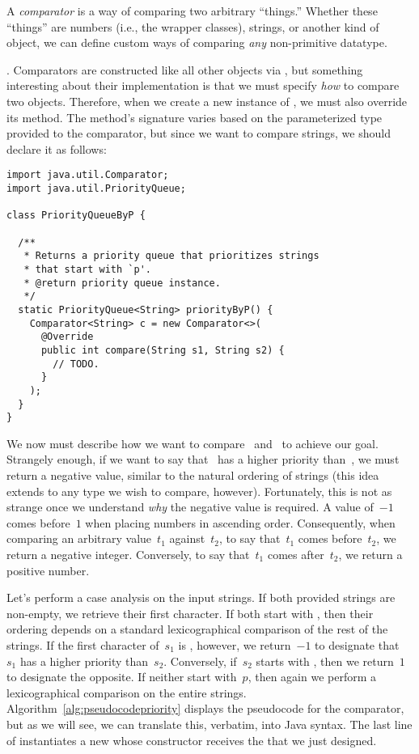 A \emph{comparator} is a way of comparing two arbitrary ``things.'' 
Whether these ``things'' are numbers (i.e., the wrapper classes), strings, or another kind of object, we can define custom ways of comparing \emph{any} non-primitive datatype.

.
Comparators are constructed like all other objects via , but something interesting about their implementation is that we must specify \emph{how} to compare two objects. 
Therefore, when we create a new instance of , we must also override its  method. 
The  method's signature varies based on the parameterized type provided to the comparator, but since we want to compare strings, we should declare it as follows:

\begin{lstlisting}[language=MyJava]
import java.util.Comparator;
import java.util.PriorityQueue;

class PriorityQueueByP {

  /**
   * Returns a priority queue that prioritizes strings 
   * that start with `p'.
   * @return priority queue instance.
   */
  static PriorityQueue<String> priorityByP() {
    Comparator<String> c = new Comparator<>(
      @Override
      public int compare(String s1, String s2) { 
        // TODO.
      }
    );
  }
}
\end{lstlisting}

We now must describe how we want to compare~ and~ to achieve our goal.
Strangely enough, if we want to say that~ has a higher priority than~, we must return a negative value, similar to the natural ordering of strings (this idea extends to any type we wish to compare, however). 
Fortunately, this is not as strange once we understand \emph{why} the negative value is required. 
A value of~$-1$ comes before~$1$ when placing numbers in ascending order. 
Consequently, when comparing an arbitrary value~$t_1$ against~$t_2$, to say that~$t_1$ comes before~$t_2$, we return a negative integer. Conversely, to say that~$t_1$ comes after~$t_2$, we return a positive number.

Let's perform a case analysis on the input strings. 
If both provided strings are non-empty, we retrieve their first character. 
If both start with , then their ordering depends on a standard lexicographical comparison of the rest of the strings. 
If the first character of~$s_1$ is , however, we return~$-1$ to designate that~$s_1$ has a higher priority than~$s_2$. 
Conversely, if~$s_2$ starts with , then we return~$1$ to designate the opposite. 
If neither start with~$p$, then again we perform a lexicographical comparison on the entire strings. 
Algorithm~\ref{alg:pseudocodepriority} displays the pseudocode for the comparator, but as we will see, we can translate this, verbatim, into Java syntax. 
The last line of  instantiates a new  whose constructor receives the  that we just designed. 

